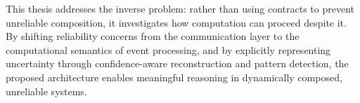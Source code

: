 This thesis addresses the inverse problem: rather than using contracts to prevent unreliable composition, it investigates how computation can proceed despite it. By shifting reliability concerns from the communication layer to the computational semantics of event processing, and by explicitly representing uncertainty through confidence-aware reconstruction and pattern detection, the proposed architecture enables meaningful reasoning in dynamically composed, unreliable systems.